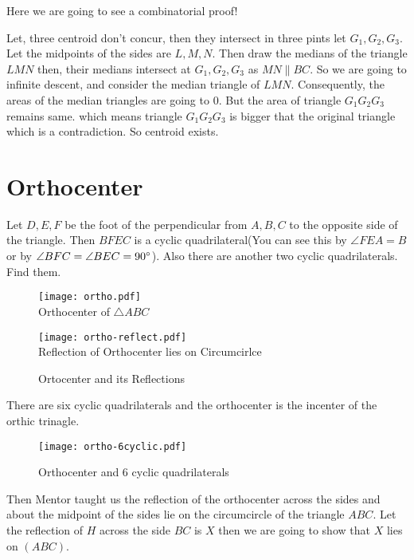 Here we are going to see a combinatorial proof!

Let, three centroid don't concur, then they intersect in three pints let \(G_1,G_2,G_3\). Let 
the midpoints of the sides are \(L,M,N\). Then draw the medians of the triangle \(LMN\) then, 
their medians intersect at \(G_1,G_2,G_3\) as \(MN\parallel BC\). So we are going to infinite 
descent, and consider the median triangle of \(LMN\). Consequently, the areas of the median 
triangles are going to \(0\). But the area of triangle \(G_1G_2G_3\) remains same. which means 
triangle \(G_1G_2G_3\) is bigger that the original triangle which is a contradiction. So 
centroid exists. 


\section{Orthocenter}

Let \(D,E,F\) be the foot of the perpendicular from \(A,B,C\) to the opposite side of the 
triangle. Then \(BFEC\) is a cyclic quadrilateral(You can see this by \(\angle FEA = B\) or by 
\(\angle BFC = \angle BEC =90^\circ\)). Also there are another two cyclic quadrilaterals. Find them.


\begin{figure}[ht]
\begin{center}
	\begin{minipage}[t]{6.5cm}
		\texttt{[image: ortho.pdf]}
	\\ \centering \sffamily Orthocenter of \(\triangle ABC\)
	\end{minipage}
		\quad
	\begin{minipage}[t]{6.5cm}
		\texttt{[image: ortho-reflect.pdf]}
	\\ \centering \sffamily Reflection of Orthocenter lies on Circumcirlce
	\end{minipage}
\end{center}	
\caption{Ortocenter and its Reflections}
\end{figure}

There are six cyclic quadrilaterals and the orthocenter is the incenter of the orthic trinagle.


\begin{figure}[ht] 
\centering
		\texttt{[image: ortho-6cyclic.pdf]}
\caption{Orthocenter and 6 cyclic quadrilaterals}
\end{figure}

Then Mentor taught us the reflection of the orthocenter across the sides and about the midpoint of the sides lie on the circumcircle of the triangle \(ABC\). 
Let the reflection of \(H\) across the side \(BC\) is \(X\) then we are going to show that \(X\) lies on \((ABC)\). 

